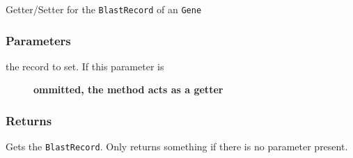 Getter/Setter for the \texttt{BlastRecord} of an \texttt{Gene}

\subsubsection*{Parameters\label{Parameters}}
\begin{description}

\item[{the record to set. If this parameter is}] \textbf{ommitted, the method acts as a getter}\end{description}
\subsubsection*{Returns\label{Returns}}


Gets the \texttt{BlastRecord}. Only returns something if there is no parameter present.
